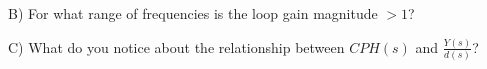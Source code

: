 \documentclass{article}	%
\begin{document}
B) For what range of frequencies is the loop gain magnitude $>1$?

C) What do you notice about the relationship between $CPH(s)$ and $\frac{Y(s)}{d(s)}$?

%
%
%
%
%
%
%
%
%
%
%
%
%
%
%
%
\subsection{}
\end{document}
